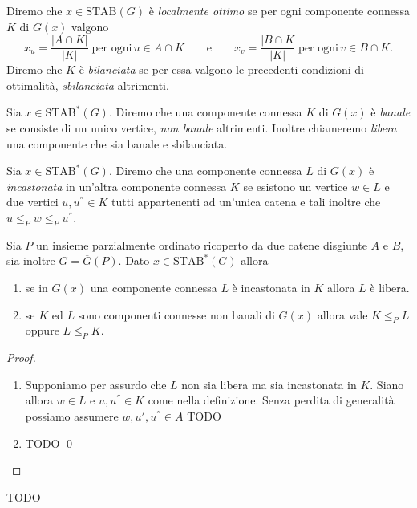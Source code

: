 \begin{definition}
	Diremo che \(x\in\text{STAB}(G)\) è \emph{localmente ottimo} se per ogni componente connessa \(K\) di \(G(x)\) valgono
	\[x_u=\frac{|A\cap K|}{|K|}\;\text{per ogni}\,u\in A\cap K\qquad\text{e}\qquad x_v=\frac{|B\cap K}{|K|}\;\text{per ogni}\,v\in B\cap K.\]
	Diremo che \(K\) è \emph{bilanciata} se per essa valgono le precedenti condizioni di ottimalità, \emph{sbilanciata} altrimenti. 
\end{definition}
\begin{definition}
	Sia \(x\in\text{STAB}^*(G)\). Diremo che una componente connessa \(K\) di \(G(x)\) è \emph{banale} se consiste di un unico vertice, \emph{non banale} altrimenti. Inoltre chiameremo \emph{libera} una componente che sia banale e sbilanciata. 
\end{definition}
\begin{definition}
	Sia \(x\in\text{STAB}^{*}(G)\). Diremo che una componente connessa \(L\) di \(G(x)\) è \emph{incastonata} in un'altra componente connessa \(K\) se esistono un vertice \(w\in L\) e due vertici \(u,u^{''}\in K\) tutti appartenenti ad un'unica catena e tali inoltre che \(u\le_{P}w\le_{P}u^{''}\). 
\end{definition}
\begin{lemma}
	\label{inlaylemma} Sia \(P\) un insieme parzialmente ordinato ricoperto da due catene disgiunte \(A\) e \(B\), sia inoltre \(G=\overline{G}(P)\). Dato \(x\in\text{STAB}^{*}(G)\) allora 
	\begin{enumerate}
		\item se in \(G(x)\) una componente connessa \(L\) è incastonata in \(K\) allora \(L\) è libera. 
		\item se \(K\) ed \(L\) sono componenti connesse non banali di \(G(x)\) allora vale \(K\le_{P}L\) oppure \(L\le_{P}K\). 
	\end{enumerate}
\end{lemma}
\begin{proof}
	\begin{enumerate}
		\item Supponiamo per assurdo che \(L\) non sia libera ma sia incastonata in \(K\). Siano allora \(w\in L\) e \(u,u^{''}\in K\) come nella definizione. Senza perdita di generalità possiamo assumere \(w,u',u^{''}\in A\) TODO 
		\item TODO \qed 
	\end{enumerate}
\end{proof}
\begin{lemma}
	\label{touchinglemma} TODO 
\end{lemma}
